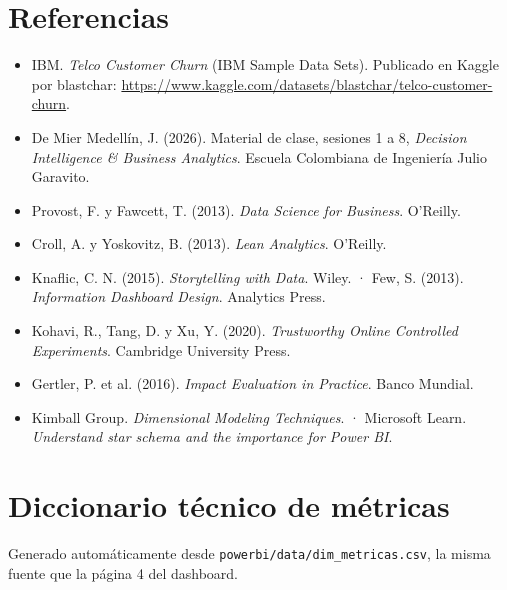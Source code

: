 \documentclass[10.5pt,a4paper]{article}
\begin{document}
\section*{Referencias}
{\footnotesize
\begin{itemize}[leftmargin=1em]
  \item IBM. \emph{Telco Customer Churn} (IBM Sample Data Sets). Publicado en Kaggle por blastchar: \url{https://www.kaggle.com/datasets/blastchar/telco-customer-churn}.
  \item De Mier Medellín, J. (2026). Material de clase, sesiones 1 a 8, \emph{Decision Intelligence \& Business Analytics}. Escuela Colombiana de Ingeniería Julio Garavito.
  \item Provost, F. y Fawcett, T. (2013). \emph{Data Science for Business}. O'Reilly.
  \item Croll, A. y Yoskovitz, B. (2013). \emph{Lean Analytics}. O'Reilly.
  \item Knaflic, C. N. (2015). \emph{Storytelling with Data}. Wiley. · Few, S. (2013). \emph{Information Dashboard Design}. Analytics Press.
  \item Kohavi, R., Tang, D. y Xu, Y. (2020). \emph{Trustworthy Online Controlled Experiments}. Cambridge University Press.
  \item Gertler, P. et al. (2016). \emph{Impact Evaluation in Practice}. Banco Mundial.
  \item Kimball Group. \emph{Dimensional Modeling Techniques}. · Microsoft Learn. \emph{Understand star schema and the importance for Power BI}.
\end{itemize}}

\clearpage
\appendix
\renewcommand{\thesection}{\Alph{section}}
\section{Diccionario técnico de métricas}
Generado automáticamente desde \texttt{powerbi/data/dim\_metricas.csv}, la misma fuente que la página 4 del dashboard.

\end{document}
